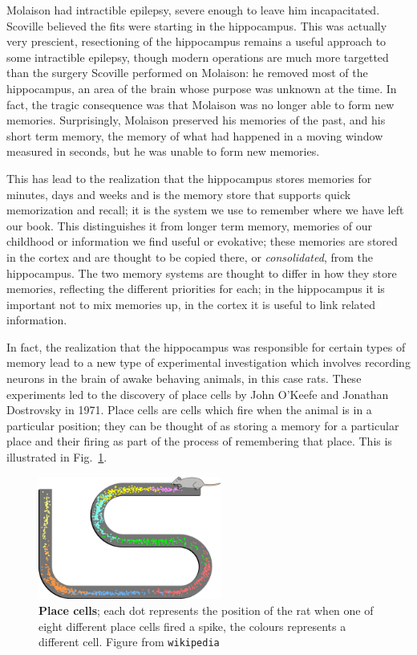 \documentclass[12pt]{article}
\begin{document}
Molaison had intractible epilepsy, severe enough to leave him
incapacitated. Scoville believed the fits were starting in the
hippocampus. This was actually very prescient, resectioning of the
hippocampus remains a useful approach to some intractible epilepsy,
though modern operations are much more targetted than the surgery
Scoville performed on Molaison: he removed most of the hippocampus, an
area of the brain whose purpose was unknown at the time. In fact, the
tragic consequence was that Molaison was no longer able to form new
memories. Surprisingly, Molaison preserved his memories of the past,
and his short term memory, the memory of what had happened in a moving
window measured in seconds, but he was unable to form new
memories.

This has lead to the realization that the hippocampus stores memories
for minutes, days and weeks and is the memory store that supports
quick memorization and recall; it is the system we use to remember
where we have left our book. This distinguishes it from longer term
memory, memories of our childhood or information we find useful or
evokative; these memories are stored in the cortex and are thought to
be copied there, or \textsl{consolidated}, from the hippocampus. The
two memory systems are thought to differ in how they store memories,
reflecting the different priorities for each; in the hippocampus it is
important not to mix memories up, in the cortex it is useful to link
related information.

In fact, the realization that the hippocampus was responsible for
certain types of memory lead to a new type of experimental
investigation which involves recording neurons in the brain of awake
behaving animals, in this case rats. These experiments led to the
discovery of place cells by John O'Keefe and Jonathan Dostrovsky in
1971. Place cells are cells which fire when the animal is in a
particular position; they can be thought of as storing a memory for a
particular place and their firing as part of the process of
remembering that place. This is illustrated in Fig.~\ref{fig_place}.


\begin{figure}[tbhp]
  \begin{center}
  \includegraphics[width=6cm]{place.png}
\end{center}
  \caption{\textbf{Place cells}; each dot represents the position of
    the rat when one of eight different place cells fired a spike, the
    colours represents a different cell. Figure from
    \texttt{wikipedia}\label{fig_place}}
\end{figure}
\end{document}

